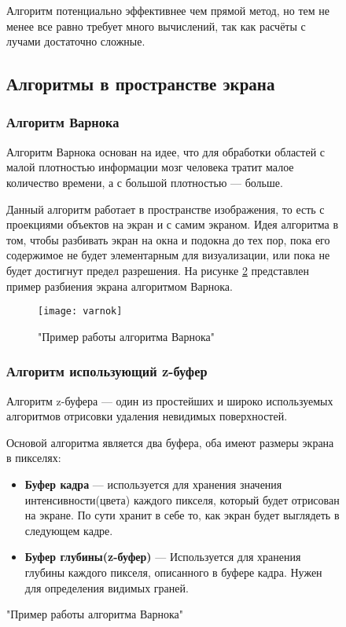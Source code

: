 \begin{figure}[h]
Алгоритм потенциально эффективнее чем прямой метод, но тем не менее все равно требует много вычислений, так как расчёты с лучами достаточно сложные. \cite{rodgers}


\subsection{Алгоритмы в пространстве экрана}
\subsubsection{Алгоритм Варнока}

Алгоритм Варнока основан на идее, что для обработки областей с малой плотностью информации мозг человека тратит малое количество времени, а с большой плотностью — больше.

Данный алгоритм работает в пространстве изображения, то есть с проекциями объектов на экран и с самим экраном. Идея алгоритма в том, чтобы разбивать экран на окна и подокна до тех пор, пока его содержимое не будет элементарным для визуализации, или пока не будет достигнут предел разрешения. На рисунке \ref{fig:varnok} представлен пример разбиения экрана алгоритмом Варнока.

\begin{figure}[h]
	\centering
	\texttt{[image: varnok]}
	\caption{"Пример работы алгоритма Варнока"}
	\label{fig:varnok}
\end{figure}

\subsubsection{Алгоритм использующий z-буфер}
Алгоритм z-буфера — один из простейших и широко используемых алгоритмов отрисовки удаления невидимых поверхностей.

Основой алгоритма является два буфера, оба имеют размеры экрана в пикселях:

\begin{itemize}
	\item \textbf{Буфер кадра} — используется для хранения значения интенсивности(цвета) каждого пикселя, который будет отрисован на экране. По сути хранит в себе то, как экран будет выглядеть в следующем кадре.
	\item \textbf{Буфер глубины(z-буфер)} — Используется для хранения глубины каждого пикселя, описанного в буфере кадра. Нужен для определения видимых граней.
\end{itemize}


\end{figure}
